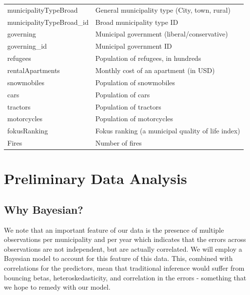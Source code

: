 \documentclass[10pt,a4paper, hidelinks]{article} %
\begin{document}
{\begin{longtable}{ll}
	municipalityTypeBroad & General municipality type (City, town, rural)\\
	municipalityTypeBroad\_id & Broad municipality type ID\\
	governing & Municipal government (liberal/conservative)\\
	governing\_id & Municipal government ID\\
	refugees & Population of refugees, in hundreds\\
	rentalApartments & Monthly cost of an apartment (in USD)\\
	snowmobiles & Population of snowmobiles\\
	cars & Population of cars\\
	tractors & Population of tractors\\
	motorcycles & Population of motorcycles\\
	fokusRanking & Fokus ranking (a municipal quality of life index)\\
	Fires & Number of fires\\
	\bottomrule
\end{longtable}}

\section{Preliminary Data Analysis}

\subsection{Why Bayesian?}

We note that an important feature of our data is the presence of multiple observations per municipality and per year which indicates that the errors across observations are not independent, but are actually correlated. We will employ a Bayesian model to account for this feature of this data. This, combined with correlations for the predictors, mean that traditional inference would suffer from bouncing betas, heteroskedasticity, and correlation in the errors - something that we hope to remedy with our model. 
\end{document}
